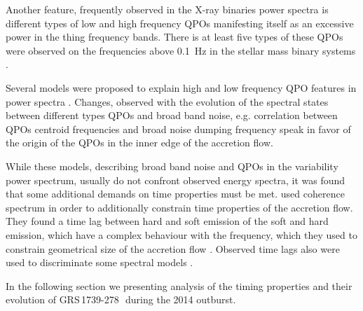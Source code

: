 \documentclass[a4paper,fleqn,usenatbib]{mnras}
\def\grs{{GRS\,1739-278\,}}
\begin{document}
    Another feature, frequently observed in the X-ray binaries power spectra is different types of low and high frequency QPOs manifesting itself as an excessive power in the thing frequency bands. 
    There is at least five types of these QPOs were observed on the frequencies above 0.1~Hz in the stellar mass binary systems \citep[for classification see][]{2005Ap&SS.300..107H}.

Several models were proposed to explain high and low frequency QPO features in power spectra \citep[][]{1997ApJ...489..865E, 1998ApJ...506..281B, 1998ApJ...492L..59S, 1999A&A...349.1003T, 1999ApJ...518L..95T, 2001A&A...374L..19A, 2009MNRAS.397L.101I, 2011MNRAS.415.2323I}. 
Changes, observed with the evolution of the spectral states between different types QPOs and broad band noise, e.g. correlation between QPOs centroid frequencies and broad noise dumping frequency \citep{1999ApJ...514..939W, 2014MNRAS.437.2554M} speak in favor of the origin of the QPOs in the inner edge of the accretion flow.

While these models, describing broad band noise and QPOs in the variability power spectrum, usually do not confront observed energy spectra, it was found that some additional demands on time properties must be met.
\citet{1997ApJ...474L..43V} used coherence spectrum in order to additionally constrain time properties of the accretion flow. 
They found a time lag between hard and soft emission of the soft and hard emission, which have a complex behaviour with the frequency, which they used to constrain geometrical size of the accretion flow \citep{1999ApJ...517..355N}. 
Observed time lags also were used to discriminate some spectral models \citep[see, e.g.,][]{2001MNRAS.327..799K}.

In the following section we presenting analysis of the timing properties and their evolution of \grs\ during the 2014 outburst.
\end{document}
